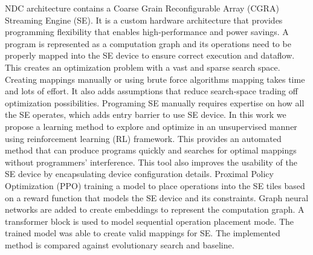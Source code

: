 NDC architecture contains a Coarse Grain Reconfigurable Array (CGRA) Streaming Engine (SE). 
It is a custom hardware architecture that provides programming flexibility that enables high-performance and power savings. 
A program is represented as a computation graph and its operations need to be properly mapped into the SE device to ensure correct execution and dataflow. 
This creates an optimization problem with a vast and sparse search space. Creating mappings manually or using brute force algorithms mapping takes time and lots of effort. 
It also adds assumptions that reduce search-space trading off optimization possibilities. Programing SE manually requires expertise on how all the SE operates, which adds entry barrier to use SE device. 
In this work we propose a learning method to explore and optimize in an unsupervised manner using reinforcement learning (RL) framework. 
This provides an automated method that can produce programs quickly and searches for optimal mappings without programmers’ interference. 
This tool also improves the usability of the SE device by encapsulating device configuration details. 
Proximal Policy Optimization (PPO) training a model to place operations into the SE tiles based on a reward function that models the SE device and its constraints. 
Graph neural networks are added to create embeddings to represent the computation graph.
 A transformer block is used to model sequential operation placement mode. 
 The trained model was able to create valid mappings for SE. 
 The implemented method is compared against evolutionary search and baseline. 